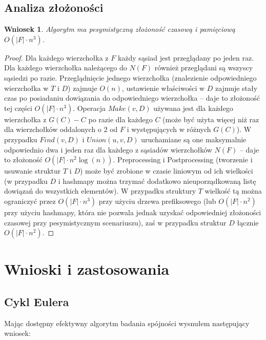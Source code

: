 \documentclass{pracamgr}
\newtheorem{corollary}[theorem]{Wniosek}
\begin{document}
   \subsection{Analiza złożoności}
    \begin{corollary}\label{zlozonosc lokalnej spojnosci}
     Algorytm ma pesymistyczną złożoność czasową i pamięciową $O(|F|\cdot n^3)$.
    \end{corollary}
    \begin{proof}
     Dla każdego wierzchołka z $F$ każdy sąsiad jest przeglądany po jeden raz.
     Dla każdego wierzchołka należącego do $N(F)$ również przeglądani są wszyscy sąsiedzi
     po razie. Przeglądnięcie jednego wierzchołka (znalezienie odpowiedniego wierzchołka w $T$ i $D$) zajmuje $O(n)$,
     ustawienie właściwości w $D$ zajmuje stały czas po posiadaniu dowiązania do odpowiedniego wierzchołka -- daje to złożoność tej części $O(|F|\cdot n^3)$.\newline
     Operacja $Make(v,D)$ używana jest dla każdego wierzchołka z $G(C)-C$ po razie dla każdego $C$
     (może być użyta więcej niż raz dla wierzchołków oddalonych o 2 od $F$ i występujących w różnych $G(C)$).
     W przypadku $Find(v,D)$ i $Union(u,v,D)$ uruchamiane są one maksymalnie odpowiednio dwa i jeden raz dla każdego z sąsiadów wierzchołków $N(F)$
     -- daje to złożoność $O(|F|\cdot n^2\log(n))$.\newline
     Preprocessing i Postprocessing (tworzenie i usuwanie struktur $T$ i $D$)
     może być zrobione w czasie liniowym od ich wielkości (w przypadku $D$ i hashmapy można trzymać dodatkowo nieuporządkowaną listę dowiązań do wszystkich
     elementów). W przypadku struktury $T$ wielkość tą można ograniczyć przez $O(|F|\cdot n^3)$ przy użyciu drzewa prefiksowego
     (lub $O(|F|\cdot n^2)$ przy użyciu hashmapy, która nie pozwala jednak uzyskać odpowiedniej złożoności czasowej przy pesymistycznym scenariuszu),
     zaś w przypadku struktur $D$ łącznie $O(|F|\cdot n^2)$.
    \end{proof}
  \section{Wnioski i zastosowania}
   \subsection{Cykl Eulera}
    Mając dostępny efektywny algorytm badania spójności wysnułem następujący wniosek: 
 
\end{document}
